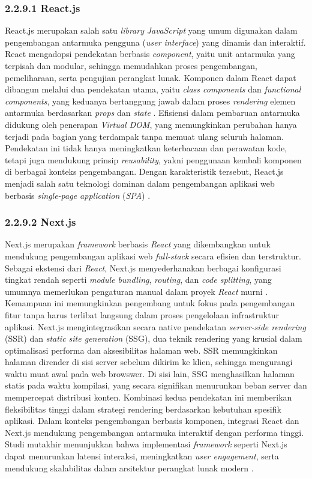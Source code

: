 \subsubsection{2.2.9.1 React.js}

React.js merupakan salah satu \emph{library} \emph{JavaScript} yang umum digunakan dalam pengembangan antarmuka pengguna (\emph{user interface}) yang dinamis dan interaktif. React mengadopsi pendekatan berbasis \emph{component}, yaitu unit antarmuka yang terpisah dan modular, sehingga memudahkan proses pengembangan, pemeliharaan, serta pengujian perangkat lunak. Komponen dalam React dapat dibangun melalui dua pendekatan utama, yaitu \emph{class components} dan \emph{functional components}, yang keduanya bertanggung jawab dalam proses \emph{rendering} elemen antarmuka berdasarkan \emph{props} dan \emph{state} \cite{Panjaitan2021}. Efisiensi dalam pembaruan antarmuka didukung oleh penerapan \emph{Virtual DOM}, yang memungkinkan perubahan hanya terjadi pada bagian yang terdampak tanpa memuat ulang seluruh halaman. Pendekatan ini tidak hanya meningkatkan keterbacaan dan perawatan kode, tetapi juga mendukung prinsip \emph{reusability}, yakni penggunaan kembali komponen di berbagai konteks pengembangan. Dengan karakteristik tersebut, React.js menjadi salah satu teknologi dominan dalam pengembangan aplikasi web berbasis \emph{single-page application} (\emph{SPA}) \cite{Panjaitan2021}.

\subsubsection{2.2.9.2 Next.js}
Next.js merupakan \emph{framework} berbasis \emph{React} yang dikembangkan untuk mendukung pengembangan aplikasi web \emph{full-stack} secara efisien dan terstruktur. Sebagai ekstensi dari \emph{React}, Next.js menyederhanakan berbagai konfigurasi tingkat rendah seperti \emph{module bundling}, \emph{routing}, dan \emph{code splitting}, yang umumnya memerlukan pengaturan manual dalam proyek \emph{React} murni \cite{Nextjs2024}. Kemampuan ini memungkinkan pengembang untuk fokus pada pengembangan fitur tanpa harus terlibat langsung dalam proses pengelolaan infrastruktur aplikasi. Next.js mengintegrasikan secara native pendekatan \emph{server-side rendering} (SSR) dan \emph{static site generation} (SSG), dua teknik rendering yang krusial dalam optimalisasi performa dan aksesibilitas halaman web. SSR memungkinkan halaman dirender di sisi server sebelum dikirim ke klien, sehingga mengurangi waktu muat awal pada web browswer. Di sisi lain, SSG menghasilkan halaman statis pada waktu kompilasi, yang secara signifikan menurunkan beban server dan mempercepat distribusi konten. Kombinasi kedua pendekatan ini memberikan fleksibilitas tinggi dalam strategi rendering berdasarkan kebutuhan spesifik aplikasi. Dalam konteks pengembangan berbasis komponen, integrasi React dan Next.js mendukung pengembangan antarmuka interaktif dengan performa tinggi. Studi mutakhir menunjukkan bahwa implementasi \emph{framework} seperti Next.js dapat menurunkan latensi interaksi, meningkatkan \emph{user engagement}, serta mendukung skalabilitas dalam arsitektur perangkat lunak modern \cite{Nextjs2024}.

